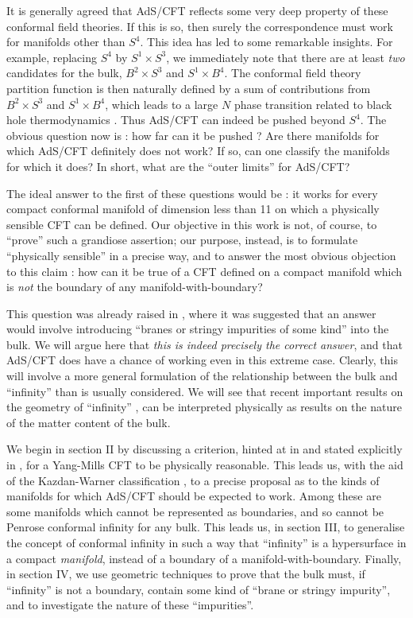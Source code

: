 \documentclass[a4paper,12pt]{article}
\theoremstyle{definition}
\renewcommand{\u}{\textit}
\renewcommand{\-}{$\dfrac{\quad\enspace}{\quad}$}
\begin{document}
It is generally agreed that AdS/CFT reflects some very deep property of these conformal field theories. If this is so, then surely the correspondence must work for manifolds other than $S^4$. This idea \cite{3} has led to some remarkable insights. For example, replacing $S^4$ by $S^1\times S^3$, we immediately note that there are at least \u{two} candidates for the bulk, $B^2\times S^3$ and $S^1\times B^4$. The conformal field theory partition function is then naturally defined by a sum of contributions from $B^2\times S^3$ and $S^1\times B^4$, which leads to a large $N$ phase transition related to black hole thermodynamics \cite{3}. Thus AdS/CFT can indeed be pushed beyond $S^4$. The obvious question now is : how far can it be pushed ? Are there manifolds for which AdS/CFT definitely does not work? If so, can one classify the manifolds for which it does? In short, what are the ``outer limits'' for AdS/CFT?

The ideal answer to the first of these questions would be : it works for every compact conformal manifold of dimension less than 11 on which a physically sensible CFT can be defined. Our objective in this work is not, of course, to ``prove'' such a grandiose assertion; our purpose, instead, is to formulate ``physically sensible'' in a precise way, and to answer the most obvious objection to this claim : how can it be true of a CFT defined on a compact manifold which is \u{not} the boundary of any manifold-with-boundary?

This question was already raised in \cite{3}, where it was suggested that an answer would involve introducing ``branes or stringy impurities of some kind'' into the bulk. We will argue here that \u{this is indeed precisely the correct answer}, and that AdS/CFT does have a chance of working even in this extreme case. Clearly, this will involve a more general formulation of the relationship between the bulk and ``infinity'' than is usually considered. We will see that recent important results on the geometry of ``infinity'' \cite{4}, \cite{5} can be interpreted physically as results on the nature of the matter content of the bulk.

We begin in section II by discussing a criterion, hinted at in \cite{3} and stated explicitly in \cite{6}, for a Yang-Mills CFT to be physically reasonable. This leads us, with the aid of the Kazdan-Warner classification \cite{7}, to a precise proposal as to the kinds of manifolds for which AdS/CFT should be expected to work. Among these are some manifolds which cannot be represented as boundaries, and so cannot be Penrose conformal infinity for any bulk. This leads us, in section III, to generalise the concept of conformal infinity in such a way that ``infinity'' is a hypersurface in a compact \u{manifold}, instead of a boundary of a manifold-with-boundary. Finally, in section IV, we use geometric techniques to prove that the bulk must, if ``infinity'' is not a boundary, contain some kind of ``brane or stringy impurity'', and to investigate the nature of these ``impurities''.
\end{document}

